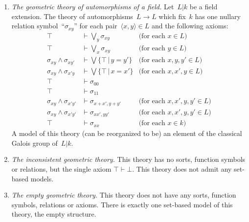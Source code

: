 \documentclass{ws-rv9x6}
\renewcommand{\_}{\mathpunct{.}}
\newcommand{\?}{\,{:}\,}
\begin{document}
\begin{enumerate}
\item \emph{The geometric theory of automorphisms of a field.}\label{par:theory-automorphisms}
Let~$L|k$ be a field
extension. The theory of automorphisms~$L \to L$ which fix~$k$ has
one nullary relation symbol~``$\sigma_{xy}$'' for each pair~$\langle x,y
\rangle \in L$ and the following axioms:
\begin{align*}
  \top &\vdash \bigvee_y \sigma_{xy} & \text{(for each~$x \in L$)} \\
  \top &\vdash \bigvee_x \sigma_{xy} & \text{(for each~$y \in L$)} \\
  \sigma_{xy} \wedge \sigma_{xy'} &\vdash \bigvee\{ \top \,|\, y = y' \} & \text{(for each~$x,y,y' \in L$)} \\
  \sigma_{xy} \wedge \sigma_{x'y} &\vdash \bigvee\{ \top \,|\, x = x' \} & \text{(for each~$x,x',y \in L$)} \\
  \top &\vdash \sigma_{00} \\
  \top &\vdash \sigma_{11} \\
  \sigma_{xy} \wedge \sigma_{x'y'} &\vdash \sigma_{x+x',y+y'} & \text{(for each~$x,x',y,y' \in L$)} \\
  \sigma_{xy} \wedge \sigma_{x'y'} &\vdash \sigma_{xx',yy'} & \text{(for each~$x,x',y,y' \in L$)} \\
  \top &\vdash \sigma_{xx} & \text{(for each~$x \in k$)}
\end{align*}
A model of this theory (can be reorganized to be) an element of the classical
Galois group of~$L|k$.

\item \emph{The inconsistent geometric theory.} This theory has no sorts,
function symbols or relations, but the single axiom $\top \vdash \bot$.
This theory does not admit any set-based models.

\item \emph{The empty geometric theory.} This theory does not have any sorts,
function symbols, relations or axioms. There is exactly one set-based model of
this theory, the empty structure.
\end{enumerate}
\end{document}
